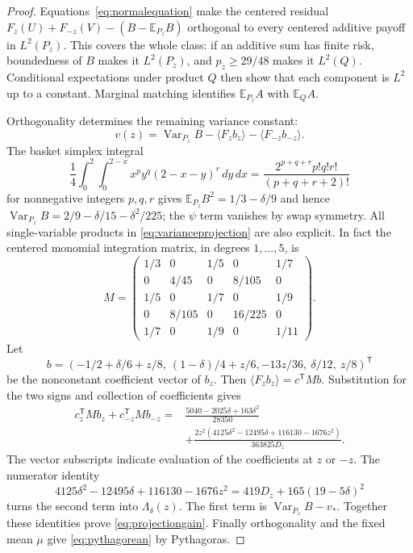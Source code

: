 \documentclass[11pt,a4paper]{amsart}
\theoremstyle{plain}
\theoremstyle{definition}
\theoremstyle{remark}
\DeclareMathOperator{\Var}{Var}
\newcommand{\EE}{\mathbb{E}}
\newcommand{\br}[1]{\langle #1\rangle}
\begin{document}
\begin{proof}
Equations~\eqref{eq:normalequation} make the centered residual
$F_z(U)+F_{-z}(V)-(B-\EE_{P_z}B)$ orthogonal to every centered additive payoff in $L^2(P_z)$. This covers the whole class: if an additive sum has finite risk, boundedness of $B$ makes it $L^2(P_z)$, and $p_z\ge29/48$ makes it $L^2(Q)$. Conditional expectations under product $Q$ then show that each component is $L^2$ up to a constant. Marginal matching identifies $\EE_{P_z}A$ with $\EE_QA$.

Orthogonality determines the remaining variance constant:
\begin{equation}\label{eq:varianceprojection}
 v(z)=\Var_{P_z}B-\br{F_zb_z}-\br{F_{-z}b_{-z}}.
\end{equation}
The basket simplex integral
\[
 \frac14\int_0^2\int_0^{2-x}x^p y^q(2-x-y)^r\,dy\,dx
 =\frac{2^{p+q+r}p!q!r!}{(p+q+r+2)!}
\]
for nonnegative integers $p,q,r$ gives $\EE_{P_z}B^2=1/3-\delta/9$ and hence
$\Var_{P_z}B=2/9-\delta/15-\delta^2/225$; the $\psi$ term vanishes by swap symmetry. All single-variable products in \eqref{eq:varianceprojection} are also explicit. In fact the centered monomial integration matrix, in degrees $1,\ldots,5$, is
\[
 M=\begin{pmatrix}
 1/3&0&1/5&0&1/7\\
 0&4/45&0&8/105&0\\
 1/5&0&1/7&0&1/9\\
 0&8/105&0&16/225&0\\
 1/7&0&1/9&0&1/11
 \end{pmatrix}.
\]
Let
\[
 b=( -1/2+\delta/6+z/8,\ (1-\delta)/4+z/6,
          -13z/36,\ \delta/12,\ z/8)^{\mathsf T}
\]
be the nonconstant coefficient vector of $b_z$. Then $\br{F_zb_z}=c^{\mathsf T}Mb$. Substitution for the two signs and collection of coefficients gives
\begin{align*}
 c_z^{\mathsf T}Mb_z+c_{-z}^{\mathsf T}Mb_{-z}
 ={}&\frac{5040-2025\delta+163\delta^2}{28350}\\
 &+\frac{2z^2(4125\delta^2-12495\delta+116130-1676z^2)}{363825D_z}.
\end{align*}
The vector subscripts indicate evaluation of the coefficients at $z$ or $-z$. The numerator identity
\[
 4125\delta^2-12495\delta+116130-1676z^2
 =419D_z+165(19-5\delta)^2
\]
turns the second term into $\Lambda_\delta(z)$. The first term is $\Var_{P_z}B-v_*$. Together these identities prove \eqref{eq:projectiongain}. Finally orthogonality and the fixed mean $\mu$ give \eqref{eq:pythagorean} by Pythagoras.
\end{proof}
\end{document}
